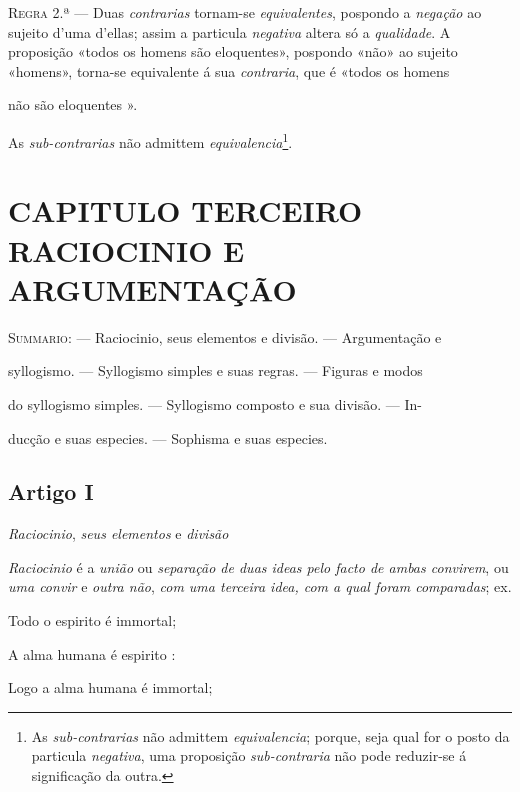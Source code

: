 \textsc{Regra} 2.ª --- Duas \emph{contrarias} tornam-se \emph{equivalentes}, pospondo a \emph{negação} ao sujeito d'uma d'ellas; assim a particula \emph{negativa} altera só a \emph{qualidade}. A proposição «todos os homens são eloquentes», pospondo «não» ao sujeito «homens», torna-se equivalente á sua \emph{contraria}, que é «todos os homens

não são eloquentes ».

As \emph{sub-contrarias} não admittem \emph{equivalencia}\footnote{As \emph{sub-contrarias} não admittem \emph{equivalencia}; porque, seja qual for o posto da particula \emph{negativa}, uma proposição \emph{sub-contraria} não pode reduzir-se á significação da outra.}.


\chapter*{CAPITULO TERCEIRO\\[0.3em]\large RACIOCINIO E ARGUMENTAÇÃO}

\textsc{Summario}: --- Raciocinio, seus elementos e divisão. --- Argumentação e

syllogismo. --- Syllogismo simples e suas regras. --- Figuras e modos

do syllogismo simples. --- Syllogismo composto e sua divisão. --- In-

ducção e suas especies. --- Sophisma e suas especies.


\section*{Artigo I}

\emph{Raciocinio}, \emph{seus elementos} e \emph{divisão}


\emph{Raciocinio} é a \emph{união} ou \emph{separação de duas ideas pelo facto de ambas convirem}, ou \emph{uma convir} e \emph{outra não}, \emph{com uma terceira idea, com a qual foram comparadas}; ex.

Todo o espirito é immortal;

A alma humana é espirito :

Logo a alma humana é immortal;

